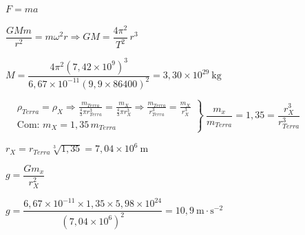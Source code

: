 \begin{solapartat}
 $F = ma$

\smallskip
{} $\dfrac{GMm}{r^2} = m\omega^2 r \Rightarrow GM = \dfrac{4\pi^2}{T^2}\,r^3$

\smallskip
{} $M = \dfrac{4\pi^2\left(7,42\times 10^{9}\right)^3}{6,67\times 10^{-11}\left(9,9\times 86400\right)^2} = 3,30\times 10^{29}\ \mathrm{kg}$
\end{solapartat}

\begin{solapartat}
 $\left.\begin{aligned}
&\rho_{Terra} = \rho_X \Rightarrow \frac{m_{Terra}}{\frac{4}{3}\pi r_{Terra}^3} = \frac{m_X}{\frac{4}{3}\pi r_X^3} \Rightarrow \frac{m_{Terra}}{r_{Terra}^3} = \frac{m_X}{r_X^3}\\[4pt]
&\text{Com: } m_X = 1,35\,m_{Terra}
\end{aligned}\right\}\ \dfrac{m_x}{m_{Terra}} = 1,35 = \dfrac{r_X^3}{r_{Terra}^3}$ 

\smallskip
{} $r_X = r_{Terra}\sqrt[3]{1,35} = 7,04\times 10^{6}\ \mathrm{m}$

\smallskip
{} $g = \dfrac{Gm_x}{r_X^2}$

\smallskip
{} $g = \dfrac{6,67\times 10^{-11}\times 1,35\times 5,98\times 10^{24}}{\left(7,04\times 10^{6}\right)^2} = 10,9\ \mathrm{m\cdot s^{-2}}$ \quad{}
\end{solapartat}
